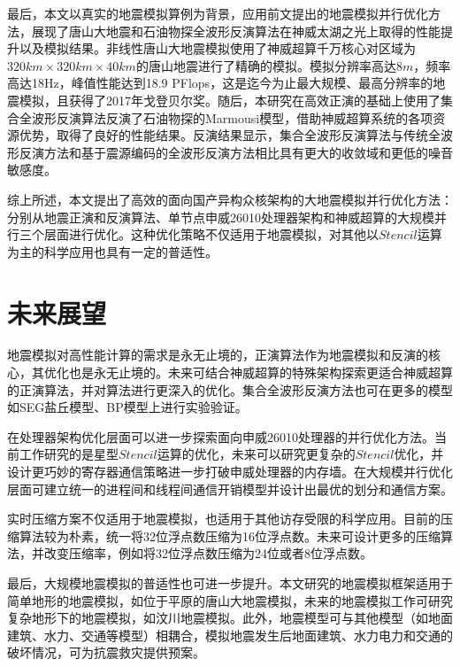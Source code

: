 最后，本文以真实的地震模拟算例为背景，应用前文提出的地震模拟并行优化方法，展现了唐山大地震和石油物探全波形反演算法在神威太湖之光上取得的性能提升以及模拟结果。非线性唐山大地震模拟使用了神威超算千万核心对区域为$320km\times 320km \times 40km$的唐山地震进行了精确的模拟。模拟分辨率高达$8m$，频率高达18Hz，峰值性能达到18.9 PFlops，这是迄今为止最大规模、最高分辨率的地震模拟，且获得了2017年戈登贝尔奖。随后，本研究在高效正演的基础上使用了集合全波形反演算法反演了石油物探的Marmousi模型，借助神威超算系统的各项资源优势，取得了良好的性能结果。反演结果显示，集合全波形反演算法与传统全波形反演方法和基于震源编码的全波形反演方法相比具有更大的收敛域和更低的噪音敏感度。

综上所述，本文提出了高效的面向国产异构众核架构的大地震模拟并行优化方法：分别从地震正演和反演算法、单节点申威26010处理器架构和神威超算的大规模并行三个层面进行优化。这种优化策略不仅适用于地震模拟，对其他以$Stencil$运算为主的科学应用也具有一定的普适性。

\section{未来展望}

地震模拟对高性能计算的需求是永无止境的，正演算法作为地震模拟和反演的核心，其优化也是永无止境的。未来可结合神威超算的特殊架构探索更适合神威超算的正演算法，并对算法进行更深入的优化。集合全波形反演方法也可在更多的模型如SEG盐丘模型、BP模型上进行实验验证。

在处理器架构优化层面可以进一步探索面向申威26010处理器的并行优化方法。当前工作研究的是星型$Stencil$运算的优化，未来可以研究更复杂的$Stencil$优化，并设计更巧妙的寄存器通信策略进一步打破申威处理器的内存墙。在大规模并行优化层面可建立统一的进程间和线程间通信开销模型并设计出最优的划分和通信方案。

实时压缩方案不仅适用于地震模拟，也适用于其他访存受限的科学应用。目前的压缩算法较为朴素，统一将32位浮点数压缩为16位浮点数。未来可设计更多的压缩算法，并改变压缩率，例如将32位浮点数压缩为24位或者8位浮点数。

最后，大规模地震模拟的普适性也可进一步提升。本文研究的地震模拟框架适用于简单地形的地震模拟，如位于平原的唐山大地震模拟，未来的地震模拟工作可研究复杂地形下的地震模拟，如汶川地震模拟。此外，地震模型可与其他模型（如地面建筑、水力、交通等模型）相耦合，模拟地震发生后地面建筑、水力电力和交通的破坏情况，可为抗震救灾提供预案。

